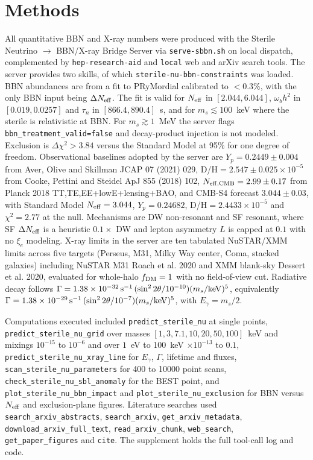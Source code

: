 \documentclass[11pt,a4paper]{article}
\begin{document}
\section{Methods}
All quantitative BBN and X-ray numbers were produced with the Sterile Neutrino $\to$ BBN/X-ray Bridge Server via \texttt{serve-sbbn.sh} on local dispatch, complemented by \texttt{hep-research-aid} and \texttt{local} web and arXiv search tools. The server provides two skills, of which \texttt{sterile-nu-bbn-constraints} was loaded. BBN abundances are from a fit to PRyMordial calibrated to $<0.3\%$, with the only BBN input being $\Delta N_{\rm eff}$. The fit is valid for $N_{\rm eff}$ in $[2.044,6.044]$, $\omega_{b}h^{2}$ in $[0.019,0.0257]$ and $\tau_{n}$ in $[866.4,890.4]$~s, and for $m_{s}\lesssim100$~keV where the sterile is relativistic at BBN. For $m_{s}\gtrsim1$~MeV the server flags \texttt{bbn\_treatment\_valid=false} and decay-product injection is not modeled. Exclusion is $\Delta\chi^{2}>3.84$ versus the Standard Model at 95\% for one degree of freedom. Observational baselines adopted by the server are $Y_{p}=0.2449\pm0.004$ from Aver, Olive and Skillman JCAP 07 (2021) 029, D/H$=2.547\pm0.025\times10^{-5}$ from Cooke, Pettini and Steidel ApJ 855 (2018) 102, $N_{\rm eff,CMB}=2.99\pm0.17$ from Planck 2018 TT,TE,EE+lowE+lensing+BAO, and CMB-S4 forecast $3.044\pm0.03$, with Standard Model $N_{\rm eff}=3.044$, $Y_{p}=0.24682$, D/H$=2.4433\times10^{-5}$ and $\chi^{2}=2.77$ at the null. Mechanisms are DW non-resonant and SF resonant, where SF $\Delta N_{\rm eff}$ is a heuristic $0.1\times$ DW and lepton asymmetry $L$ is capped at $0.1$ with no $\xi_{e}$ modeling. X-ray limits in the server are ten tabulated NuSTAR/XMM limits across five targets (Perseus, M31, Milky Way center, Coma, stacked galaxies) including NuSTAR M31 Roach et al. 2020 and XMM blank-sky Dessert et al. 2020, evaluated for whole-halo $f_{\rm DM}=1$ with no field-of-view cut. Radiative decay follows $\Gamma=1.38\times10^{-32}\,{\rm s^{-1}}\,(\sin^{2}2\theta/10^{-10})(m_{s}/{\rm keV})^{5}$, equivalently $\Gamma=1.38\times10^{-29}\,{\rm s^{-1}}\,(\sin^{2}2\theta/10^{-7})(m_{s}/{\rm keV})^{5}$, with $E_{\gamma}=m_{s}/2$.

Computations executed included \texttt{predict\_sterile\_nu} at single points, \texttt{predict\_sterile\_nu\_grid} over masses $[1,3,7.1,10,20,50,100]$~keV and mixings $10^{-15}$ to $10^{-6}$ and over $1$~eV to 100~keV $\times10^{-13}$ to $0.1$, \texttt{predict\_sterile\_nu\_xray\_line} for $E_{\gamma}$, $\Gamma$, lifetime and fluxes, \texttt{scan\_sterile\_nu\_parameters} for 400 to 10000 point scans, \texttt{check\_sterile\_nu\_sbl\_anomaly} for the BEST point, and \texttt{plot\_sterile\_nu\_bbn\_impact} and \texttt{plot\_sterile\_nu\_exclusion} for BBN versus $N_{\rm eff}$ and exclusion-plane figures. Literature searches used \texttt{search\_arxiv\_abstracts}, \texttt{search\_arxiv}, \texttt{get\_arxiv\_metadata}, \texttt{download\_arxiv\_full\_text}, \texttt{read\_arxiv\_chunk}, \texttt{web\_search}, \texttt{get\_paper\_figures} and \texttt{cite}. The supplement holds the full tool-call log and code.
\end{document}
